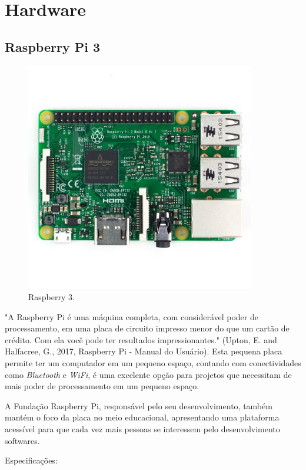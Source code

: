 \documentclass[
	12pt,				%
	oneside,			%
	a4paper,			%
	brazil				%
]{abntex2}
\begin{document}
\newpage

\section{Hardware}

\subsection{Raspberry Pi 3}

\begin{figure}[!h]
\centering
\includegraphics[width=10cm, center]{images/raspberry-pi}
\caption{Raspberry 3.}
\label{Rotulo}
\end{figure}

"A Raspberry Pi é uma máquina completa, com considerável poder de processamento, em uma placa de circuito impresso menor do que um cartão de crédito. Com ela você pode ter resultados impressionantes." (Upton, E. and Halfacree, G., 2017, Raspberry Pi - Manual do Usuário). Esta pequena placa permite ter um computador em um pequeno espaço, contando com conectividades como \textit{Bluetooth} e \textit{WiFi}, é uma excelente opção para projetos que necessitam de mais poder de processamento em um pequeno espaço. 

A Fundação Raspberry Pi, responsável pelo seu desenvolvimento, também mantém o foco da placa no meio educacional, apresentando uma plataforma acessível para que cada vez mais pessoas se interessem pelo desenvolvimento softwares.

Especificações:
\end{document}
